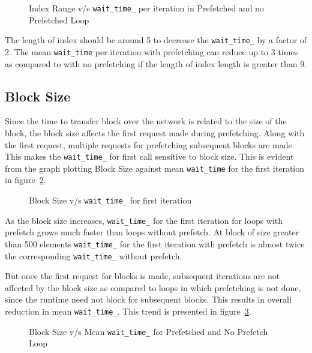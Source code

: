 \begin{figure}[h]
  
  \caption{Index Range v/s \texttt{wait\_time\_} per iteration in Prefetched and no Prefetched Loop}
  \label{fig:p_np_mean}
\end{figure}

The length of index should be around 5 to decrease the \texttt{wait\_time\_}
by a factor of 2. The mean \texttt{wait\_time} per iteration with prefetching can
reduce up to 3 times as compared to with no prefetching if the length of index
length is greater than 9.

\subsection{Block Size}
Since the time to transfer block over the network is related to the size of the block, the
block size affects the first request made during prefetching. Along with the first
request, multiple requests for prefetching subsequent blocks are made. This makes
the \texttt{wait\_time\_} for first call sensitive to block size. This is evident
from the graph plotting Block Size against mean \texttt{wait\_time} for the first
iteration in figure~\ref{fig:first_wait_time}.
\begin{figure}[h]
  
  \caption{Block Size v/s \texttt{wait\_time\_} for first iteration}
  \label{fig:first_wait_time}
\end{figure}

As the block size increases, \texttt{wait\_time\_} for the first iteration for loops
with prefetch grows much faster than loops without prefetch. At block of size
greater than 500 elements \texttt{wait\_time\_} for the first iteration with prefetch
is almost twice the corresponding \texttt{wait\_time\_} without prefetch.

But once the first request for blocks is made, subsequent iterations are not affected
by the block size as compared to loops in which prefetching is not done, since the
runtime need not block for subsequent blocks. This results in overall reduction
in mean \texttt{wait\_time\_}. This trend is presented in figure~\ref{fig:block_size_avg_wait_time}.
\begin{figure}[h]
  
  \caption{Block Size v/s Mean \texttt{wait\_time\_} for Prefetched and No Prefetch Loop}
  \label{fig:block_size_avg_wait_time}
\end{figure}


